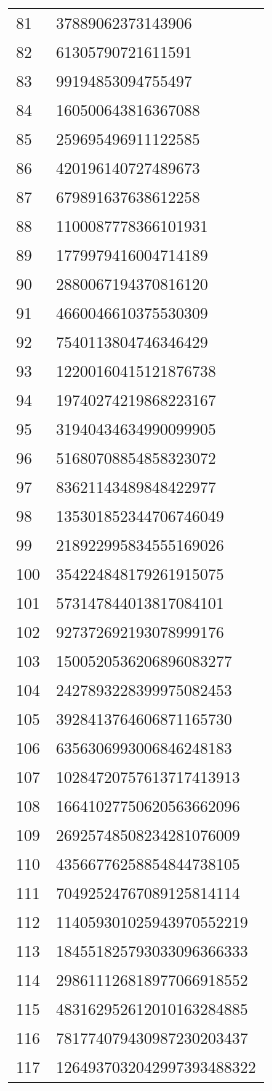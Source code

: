 \documentclass[12pt]{article}
\begin{document}
\begin{tabular}{l|l}
81 & 37889062373143906 \\
82 & 61305790721611591 \\
83 & 99194853094755497 \\
84 & 160500643816367088 \\
85 & 259695496911122585 \\
86 & 420196140727489673 \\
87 & 679891637638612258 \\
88 & 1100087778366101931 \\
89 & 1779979416004714189 \\
90 & 2880067194370816120 \\
91 & 4660046610375530309 \\
92 & 7540113804746346429 \\
93 & 12200160415121876738 \\
94 & 19740274219868223167 \\
95 & 31940434634990099905 \\
96 & 51680708854858323072 \\
97 & 83621143489848422977 \\
98 & 135301852344706746049 \\
99 & 218922995834555169026 \\
100 & 354224848179261915075 \\
101 & 573147844013817084101 \\
102 & 927372692193078999176 \\
103 & 1500520536206896083277 \\
104 & 2427893228399975082453 \\
105 & 3928413764606871165730 \\
106 & 6356306993006846248183 \\
107 & 10284720757613717413913 \\
108 & 16641027750620563662096 \\
109 & 26925748508234281076009 \\
110 & 43566776258854844738105 \\
111 & 70492524767089125814114 \\
112 & 114059301025943970552219 \\
113 & 184551825793033096366333 \\
114 & 298611126818977066918552 \\
115 & 483162952612010163284885 \\
116 & 781774079430987230203437 \\
117 & 1264937032042997393488322 \\

\end{tabular}
\end{document}
